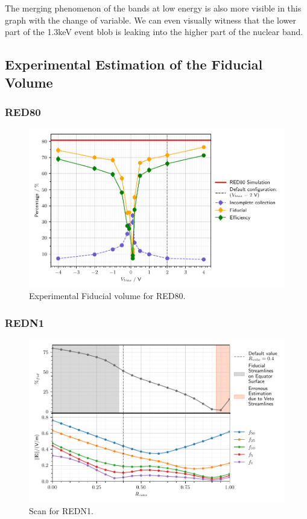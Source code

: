 The merging phenomenon of the bands at low energy is also more visible in this graph with the change of variable. We can even visually witness that the lower part of the 1.3keV event blob is leaking into the higher part of the nuclear band.


\subsection{Experimental Estimation of the Fiducial Volume}


\subsubsection{RED80}

\begin{figure}
\centering
\includegraphics[scale=1]{Figures/ElectrodesExperimental/red80_experimental_fiducial_volume.pdf}
\caption{Experimental Fiducial volume for RED80.}
\label{fig:redn1-experimental-fiducial-volume}
\end{figure}


\subsubsection{REDN1}

\begin{figure}
\centering
\includegraphics[scale=1]{Figures/ElectrodesExperimental/redn1_scan_veto_ratio.pdf}
\caption{Scan for REDN1.}
\label{fig:red80-scheme}
\end{figure}

